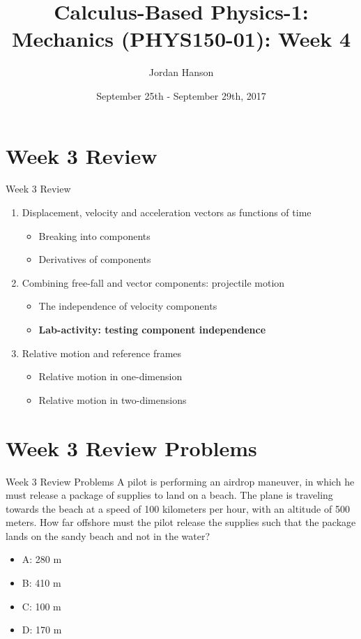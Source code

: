 \documentclass{beamer}
\title{Calculus-Based Physics-1: Mechanics (PHYS150-01): Week 4}
\date{September 25th - September 29th, 2017}
\author{Jordan Hanson}
\institute{Whittier College Department of Physics and Astronomy}
\begin{document}
\maketitle

\section{Week 3 Review}

\begin{frame}{Week 3 Review}
\begin{enumerate}
\item Displacement, velocity and acceleration vectors \alert{as functions of time}
\begin{itemize}
\item Breaking into components
\item Derivatives of components
\end{itemize}
\item Combining free-fall and vector components: \alert{projectile motion}
\begin{itemize}
\item The independence of velocity components
\item \textbf{Lab-activity: testing component independence}
\end{itemize}
\item Relative motion and reference frames
\begin{itemize}
\item Relative motion in one-dimension
\item Relative motion in two-dimensions
\end{itemize}
\end{enumerate}
\end{frame}

\section{Week 3 Review Problems}

\begin{frame}{Week 3 Review Problems}
\small
A pilot is performing an airdrop maneuver, in which he must release a package of supplies to land on a beach.  The plane is traveling towards the beach at a speed of 100 kilometers per hour, with an altitude of 500 meters.  How far offshore must the pilot release the supplies such that the package lands on the sandy beach and not in the water?
\begin{itemize}
\item A: 280 m 
\item B: 410 m
\item C: 100 m
\item D: 170 m
\end{itemize}
\end{frame}
\end{document}
